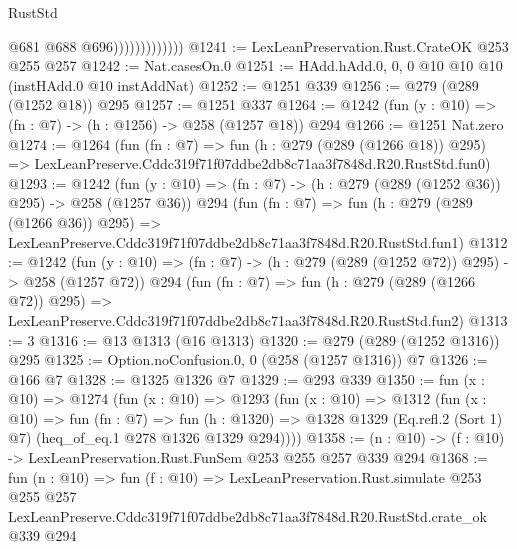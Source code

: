 \begin{lexlean}{RustStd}
\begin{coremodule}
                              @681
                              @688
                              @696)))))))))))))
@1241 := LexLeanPreservation.Rust.CrateOK @253 @255 @257
@1242 := Nat.casesOn.{0}
@1251 := HAdd.hAdd.{0, 0, 0} @10 @10 @10 (instHAdd.{0} @10 instAddNat)
@1252 := @1251 @339
@1256 := @279 (@289 (@1252 @18)) @295
@1257 := @1251 @337
@1264 := @1242 (fun (y : @10) => (fn : @7) -> (h : @1256) -> @258 (@1257 @18)) @294
@1266 := @1251 Nat.zero
@1274 := @1264
    (fun (fn : @7) =>
    fun (h : @279 (@289 (@1266 @18)) @295) =>
    LexLeanPreserve.Cddc319f71f07ddbe2db8c71aa3f7848d.R20.RustStd.fun0)
@1293 := @1242
    (fun (y : @10) => (fn : @7) -> (h : @279 (@289 (@1252 @36)) @295) -> @258 (@1257 @36))
    @294
    (fun (fn : @7) =>
    fun (h : @279 (@289 (@1266 @36)) @295) =>
    LexLeanPreserve.Cddc319f71f07ddbe2db8c71aa3f7848d.R20.RustStd.fun1)
@1312 := @1242
    (fun (y : @10) => (fn : @7) -> (h : @279 (@289 (@1252 @72)) @295) -> @258 (@1257 @72))
    @294
    (fun (fn : @7) =>
    fun (h : @279 (@289 (@1266 @72)) @295) =>
    LexLeanPreserve.Cddc319f71f07ddbe2db8c71aa3f7848d.R20.RustStd.fun2)
@1313 := 3
@1316 := @13 @1313 (@16 @1313)
@1320 := @279 (@289 (@1252 @1316)) @295
@1325 := Option.noConfusion.{0, 0} (@258 (@1257 @1316)) @7
@1326 := @166 @7
@1328 := @1325 @1326 @7
@1329 := @293 @339
@1350 := fun (x : @10) =>
  @1274
    (fun (x : @10) =>
    @1293
      (fun (x : @10) =>
      @1312
        (fun (x : @10) =>
        fun (fn : @7) =>
        fun (h : @1320) =>
        @1328 @1329 (Eq.refl.{2} (Sort 1) @7) (heq_of_eq.{1} @278 @1326 @1329 @294))))
@1358 := (n : @10) -> (f : @10) -> LexLeanPreservation.Rust.FunSem @253 @255 @257 @339 @294
@1368 := fun (n : @10) =>
  fun (f : @10) =>
  LexLeanPreservation.Rust.simulate
    @253
    @255
    @257
    LexLeanPreserve.Cddc319f71f07ddbe2db8c71aa3f7848d.R20.RustStd.crate_ok
    @339
    @294
\end{coremodule}
\end{lexlean}
